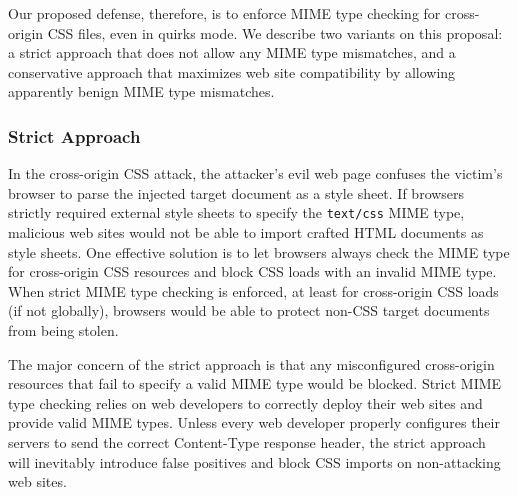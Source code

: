 \documentclass{acm_proc_article-sp}
\begin{document}
Our proposed defense, therefore, is to enforce MIME type checking for
cross-origin CSS files, even in quirks mode. We describe two variants on this
proposal: a strict approach that does not allow any MIME type mismatches, and
a conservative approach that maximizes web site compatibility by allowing
apparently benign MIME type mismatches.

\subsubsection{Strict Approach}
In the cross-origin CSS attack, the attacker's evil web page confuses the victim's browser to parse the injected target document as a style sheet. If browsers strictly required external style sheets to specify the \texttt{text/css} MIME type, malicious web sites would not be able to import crafted HTML documents as style sheets. One effective solution is to let browsers always check the MIME type for cross-origin CSS resources and block CSS loads with an invalid MIME type. When strict MIME type checking is enforced, at least for cross-origin CSS loads (if not globally), browsers would be able to protect non-CSS target documents from being stolen.

The major concern of the strict approach is that any misconfigured cross-origin resources that fail to specify a valid MIME type would be blocked. Strict MIME type checking relies on web developers to correctly deploy their web sites and provide valid MIME types. Unless every web developer properly configures their servers to send the correct Content-Type response header, the strict approach will inevitably introduce false positives and block CSS imports on non-attacking web sites.
\end{document}
